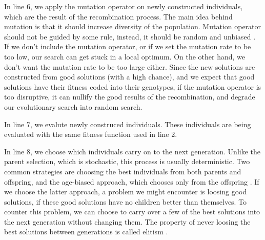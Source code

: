 In line 6, we apply the mutation operator on newly constructed individuals, which are the result of the recombination process. The main idea behind mutation is that it should increase diversity of the population. Mutation operator should not be guided by some rule, instead, it should be random and unbiased \citep{eiben2015evolutionarycomputing}. If we don't include the mutation operator, or if we set the mutation rate to be too low, our search can get stuck in a local optimum. On the other hand, we don't want the mutation rate to be too large either. Since the new solutions are constructed from good solutions (with a high chance), and we expect that good solutions have their fitness coded into their genotypes, if the mutation operator is too disruptive, it can nullify the good results of the recombination, and degrade our evolutionary search into random search. 

In line 7, we evalute newly construced individuals. These individuals are being evaluated with the same fitness function used in line 2.

In line 8, we choose which individuals carry on to the next generation. Unlike the parent selection, which is stochastic, this process is usually deterministic. Two common strategies are choosing the best individuals from both parents and offspring, and the age-biased approach, which chooses only from the offspring \citep{eiben2015evolutionarycomputing}. If we choose the latter approach, a problem we might encounter is loosing good solutions, if these good solutions have no children better than themselves. To counter this problem, we can choose to carry over a few of the best solutions into the next generation without changing them. The property of never loosing the best solutions between generations is called elitism \citep{cupic2019evolucijskoracunarstvo}.